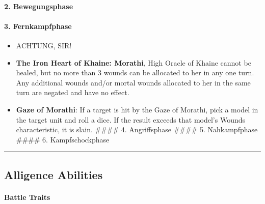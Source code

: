 \hypertarget{bewegungsphase}{%
\paragraph{2. Bewegungsphase}\label{bewegungsphase}}

\hypertarget{fernkampfphase}{%
\paragraph{3. Fernkampfphase}\label{fernkampfphase}}

\begin{itemize}
\tightlist
\item
  ACHTUNG, SIR!
\item
  \textbf{The Iron Heart of Khaine: Morathi}, High Oracle of Khaine
  cannot be healed, but no more than 3 wounds can be allocated to her in
  any one turn. Any additional wounds and/or mortal wounds allocated to
  her in the same turn are negated and have no effect.
\item
  \textbf{Gaze of Morathi}: If a target is hit by the Gaze of Morathi,
  pick a model in the target unit and roll a dice. If the result exceeds
  that model's Wounds characteristic, it is slain. \#\#\#\# 4.
  Angriffsphase \#\#\#\# 5. Nahkampfphase \#\#\#\# 6. Kampfschockphase
\end{itemize}

\begin{center}\rule{0.5\linewidth}{\linethickness}\end{center}

\hypertarget{alligence-abilities}{%
\subsection{Alligence Abilities}\label{alligence-abilities}}

\hypertarget{battle-traits}{%
\paragraph{Battle Traits}\label{battle-traits}}

